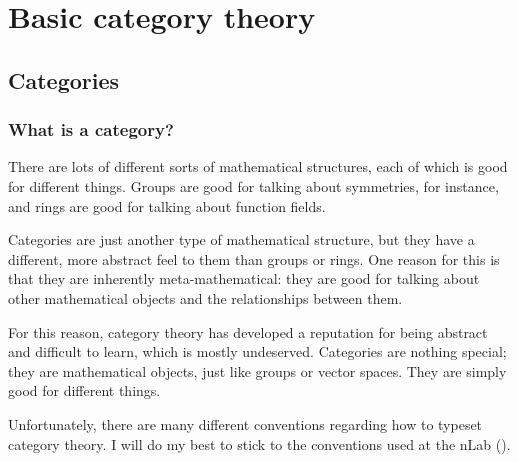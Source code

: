 \documentclass[notes.tex]{subfiles}
\begin{document}
\chapter{Basic category theory}\label{ch:categories}

\section{Categories}\label{sec:categoriesbasicdefinitions}

\subsection{What is a category?}

There are lots of different sorts of mathematical structures, each of which is good for different things. Groups are good for talking about symmetries, for instance, and rings are good for talking about function fields.

Categories are just another type of mathematical structure, but they have a different, more abstract feel to them than groups or rings. One reason for this is that they are inherently meta-mathematical: they are good for talking about other mathematical objects and the relationships between them.

For this reason, category theory has developed a reputation for being abstract and difficult to learn, which is mostly undeserved. Categories are nothing special; they are mathematical objects, just like groups or vector spaces. They are simply good for different things.

Unfortunately, there are many different conventions regarding how to typeset category theory. I will do my best to stick to the conventions used at the nLab (\cite{nlab}).
\end{document}
